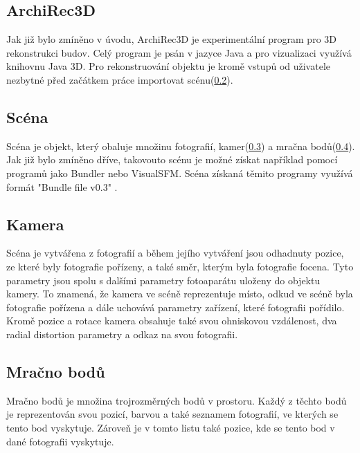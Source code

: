 \documentclass[11pt,twoside,a4paper]{book}
\begin{document}
\subsection{ArchiRec3D}
Jak již bylo zmíněno v úvodu, ArchiRec3D je experimentální program pro 3D rekonstrukci budov. Celý program je psán v jazyce Java a pro vizualizaci využívá knihovnu Java 3D. Pro rekonstruování objektu je kromě vstupů od uživatele nezbytné před začátkem práce importovat scénu(\ref{scena}). 

\subsection{Scéna}
\label{scena}
Scéna je objekt, který obaluje množinu fotografií, kamer(\ref{kamera}) a mračna bodů(\ref{mracno}). Jak již bylo zmíněno dříve, takovouto scénu je možné získat například pomocí programů jako Bundler nebo VisualSFM. Scéna získaná těmito programy využívá formát "Bundle file v0.3" \cite{BundleMan}.

\subsection{Kamera}
\label{kamera}
Scéna je vytvářena z fotografií a během jejího vytváření jsou odhadnuty pozice, ze které byly fotografie pořízeny, a také směr, kterým byla fotografie focena. Tyto parametry jsou spolu s dalšími parametry fotoaparátu uloženy do objektu kamery. To znamená, že kamera ve scéně reprezentuje místo, odkud ve scéně byla fotografie pořízena a dále uchovává parametry zařízení, které fotografii pořídilo. Kromě pozice a rotace kamera obsahuje také svou ohniskovou vzdálenost, dva radial distortion parametry a odkaz na svou fotografii. 

\subsection{Mračno bodů}
\label{mracno}
Mračno bodů je množina trojrozměrných bodů v prostoru. Každý z těchto bodů je reprezentován svou pozicí, barvou a také seznamem fotografií, ve kterých se tento bod vyskytuje. Zároveň je v tomto listu také pozice, kde se tento bod v dané fotografii vyskytuje. 
\end{document}
